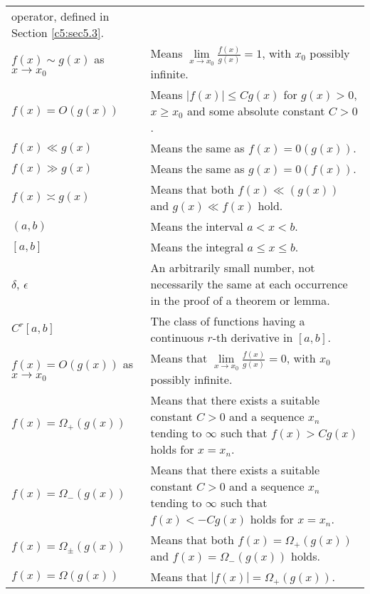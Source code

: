 \begin{longtable}{p{3cm}p{7cm}}
  operator, defined in Section \ref{c5:sec5.3}.\\
  $f(x) \sim g(x)$ as\break  $x \to x_0$ & Means
  $\displaystyle{\lim\limits_{x \to x_0} \frac{f(x)}{g(x)}=1}$, with
    $x_0$ possibly infinite.\\
  $f(x)= O (g(x))$ & Means $| f(x)| \leq Cg (x)$ for $g(x)> 0$, $x
    \geq x_0$ and some absolute constant $C > 0$.\\
  $f(x) \ll g(x)$ & Means the same as $f(x)= 0(g(x))$.\\
    $f(x) \gg g(x)$ & Means the same as $g(x)= 0(f(x))$.\\  
    $f(x) \asymp g(x)$ & Means that both $f(x) \ll (g(x))$ and $g(x)
    \ll f(x)$ hold.\\
    $(a, b)$ & Means the interval $a < x < b$.\\
    $[a, b]$ & Means the integral $a \leq x \leq b$.\\
    $\delta $, $\epsilon$ & An arbitrarily small number, not
    necessarily the same at each occurrence in the proof of a theorem
    or lemma.\\
    $C^r [a, b]$ & The class of functions having a continuous $r$-th
    derivative in $[a, b]$.\\
    $f(x) = O (g (x))$ as $x \to x_0$ & Means that
    $\displaystyle{\lim\limits_{x \to x_0}}\frac{f(x)}{g(x)}=0$, with
    $x_0$ possibly infinite.\\
    $f(x) = \Omega_+ (g(x))$ & Means that there exists a suitable
    constant $C> 0$ and a sequence $x_n$ tending to $\infty$ such that
    $f(x) > C g(x)$ holds for $x= x_n$.\\
    $f(x)= \Omega_- (g(x))$ & Means that there exists a suitable
    constant $C> 0$ and a sequence $x_n$ tending to $\infty$ such that
    $f(x) < - Cg (x)$ holds for $x= x_n$.\\
    $f(x) = \Omega_{\pm}(g(x))$ & Means that both $f(x) = \Omega_+
    (g(x))$ and $f(x) = \Omega_- (g(x))$ holds.\\
    $f(x) = \Omega (g(x))$ & Means that $|f(x)|= \Omega_+ (g(x))$.
\end{longtable}
